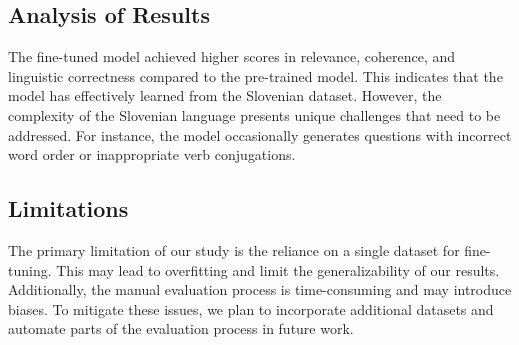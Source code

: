 \documentclass[fleqn,moreauthors,10pt]{ds_report}
\begin{document}

\subsection*{Analysis of Results}
The fine-tuned model achieved higher scores in relevance, coherence, and linguistic correctness compared to the pre-trained model. This indicates that the model has effectively learned from the Slovenian dataset. However, the complexity of the Slovenian language presents unique challenges that need to be addressed. For instance, the model occasionally generates questions with incorrect word order or inappropriate verb conjugations.

\subsection*{Limitations}
The primary limitation of our study is the reliance on a single dataset for fine-tuning. This may lead to overfitting and limit the generalizability of our results. Additionally, the manual evaluation process is time-consuming and may introduce biases. To mitigate these issues, we plan to incorporate additional datasets and automate parts of the evaluation process in future work.
\end{document}
